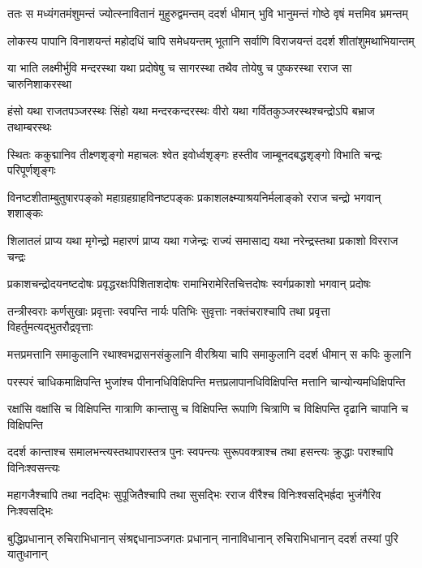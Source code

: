 
\twolineshloka
{ततः स मध्यंगतमंशुमन्तं ज्योत्स्नावितानं मुहुरुद्वमन्तम्}
{ददर्श धीमान् भुवि भानुमन्तं गोष्ठे वृषं मत्तमिव भ्रमन्तम्} %

\twolineshloka
{लोकस्य पापानि विनाशयन्तं महोदधिं चापि समेधयन्तम्}
{भूतानि सर्वाणि विराजयन्तं ददर्श शीतांशुमथाभियान्तम्} %

\twolineshloka
{या भाति लक्ष्मीर्भुवि मन्दरस्था यथा प्रदोषेषु च सागरस्था}
{तथैव तोयेषु च पुष्करस्था रराज सा चारुनिशाकरस्था} %

\twolineshloka
{हंसो यथा राजतपञ्जरस्थः सिंहो यथा मन्दरकन्दरस्थः}
{वीरो यथा गर्वितकुञ्जरस्थश्चन्द्रोऽपि बभ्राज तथाम्बरस्थः} %

\twolineshloka
{स्थितः ककुद्मानिव तीक्ष्णशृङ्गो महाचलः श्वेत इवोर्ध्वशृङ्गः}
{हस्तीव जाम्बूनदबद्धशृङ्गो विभाति चन्द्रः परिपूर्णशृङ्गः} %

\twolineshloka
{विनष्टशीताम्बुतुषारपङ्को महाग्रहग्राहविनष्टपङ्कः}
{प्रकाशलक्ष्म्याश्रयनिर्मलाङ्को रराज चन्द्रो भगवान् शशाङ्कः} %

\twolineshloka
{शिलातलं प्राप्य यथा मृगेन्द्रो महारणं प्राप्य यथा गजेन्द्रः}
{राज्यं समासाद्य यथा नरेन्द्रस्तथा प्रकाशो विरराज चन्द्रः} %

\twolineshloka
{प्रकाशचन्द्रोदयनष्टदोषः प्रवृद्धरक्षःपिशिताशदोषः}
{रामाभिरामेरितचित्तदोषः स्वर्गप्रकाशो भगवान् प्रदोषः} %

\twolineshloka
{तन्त्रीस्वराः कर्णसुखाः प्रवृत्ताः स्वपन्ति नार्यः पतिभिः सुवृत्ताः}
{नक्तंचराश्चापि तथा प्रवृत्ता विहर्तुमत्यद्भुतरौद्रवृत्ताः} %

\twolineshloka
{मत्तप्रमत्तानि समाकुलानि रथाश्वभद्रासनसंकुलानि}
{वीरश्रिया चापि समाकुलानि ददर्श धीमान् स कपिः कुलानि} %

\twolineshloka
{परस्परं चाधिकमाक्षिपन्ति भुजांश्च पीनानधिविक्षिपन्ति}
{मत्तप्रलापानधिविक्षिपन्ति मत्तानि चान्योन्यमधिक्षिपन्ति} %

\twolineshloka
{रक्षांसि वक्षांसि च विक्षिपन्ति गात्राणि कान्तासु च विक्षिपन्ति}
{रूपाणि चित्राणि च विक्षिपन्ति दृढानि चापानि च विक्षिपन्ति} %

\twolineshloka
{ददर्श कान्ताश्च समालभन्त्यस्तथापरास्तत्र पुनः स्वपन्त्यः}
{सुरूपवक्त्राश्च तथा हसन्त्यः क्रुद्धाः पराश्चापि विनिःश्वसन्त्यः} %

\twolineshloka
{महागजैश्चापि तथा नदद्भिः सुपूजितैश्चापि तथा सुसद्भिः}
{रराज वीरैश्च विनिःश्वसद्भिर्ह्रदा भुजंगैरिव निःश्वसद्भिः} %

\twolineshloka
{बुद्धिप्रधानान् रुचिराभिधानान् संश्रद्दधानाञ्जगतः प्रधानान्}
{नानाविधानान् रुचिराभिधानान् ददर्श तस्यां पुरि यातुधानान्} %

